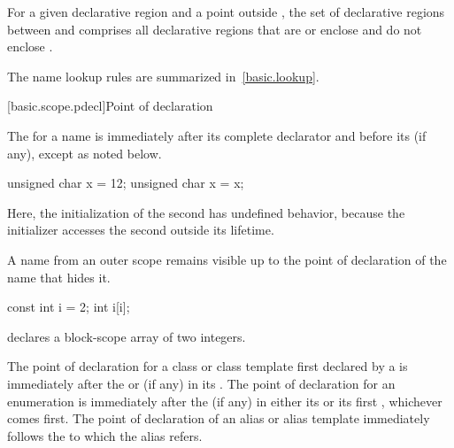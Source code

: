 \pnum
For a given declarative region 
and a point  outside ,
the set of  declarative regions
between  and 
comprises all declarative regions
that are or enclose  and do not enclose .

\pnum
\begin{note}
The name lookup rules are summarized in~\ref{basic.lookup}.
\end{note}

[basic.scope.pdecl]{Point of declaration}

%

\pnum
{}%
%
The  for a name is immediately after its
complete declarator and before its
 (if any), except as noted below.
\begin{example}
\begin{codeblock}
unsigned char x = 12;
{ unsigned char x = x; }
\end{codeblock}
Here, the initialization of the second  has undefined behavior,
because the initializer accesses the second 
outside its lifetime.
\end{example}

\pnum
\begin{note}
%
A name from an outer scope remains visible up
to the point of declaration of the name that hides it.
\begin{example}
\begin{codeblock}
const int  i = 2;
{ int  i[i]; }
\end{codeblock}
declares a block-scope array of two integers.
\end{example}
\end{note}

\pnum
The point of declaration for a class or class template first declared by a
 is immediately after the  or
 (if any) in its .
The point of declaration for an enumeration is
immediately after the  (if any) in either its
 or its first
, whichever comes first.
The point of declaration of an alias or alias template immediately
follows the  to which the
alias refers.

